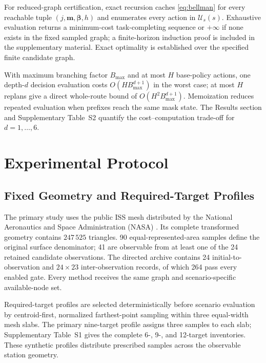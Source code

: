 \documentclass{IEEEtaes}
\begin{document}
For reduced-graph certification, exact recursion caches \eqref{eq:bellman} for every reachable tuple $(j,\mathbf m,\boldsymbol\beta,h)$ and enumerates every action in $\mathcal U_s(s)$. Exhaustive evaluation returns a minimum-cost task-completing sequence or $+\infty$ if none exists in the fixed sampled graph; a finite-horizon induction proof is included in the supplementary material. Exact optimality is established over the specified finite candidate graph.

With maximum branching factor $B_{\max}$ and at most $H$ base-policy actions, one depth-$d$ decision evaluation costs $O(HB_{\max}^{d+1})$ in the worst case; at most $H$ replans give a direct whole-route bound of $O(H^2B_{\max}^{d+1})$. Memoization reduces repeated evaluation when prefixes reach the same mask state. The Results section and Supplementary Table~S2 quantify the cost--computation trade-off for $d=1,\ldots,6$.


\section{Experimental Protocol}
\label{sec:simulation}

\subsection{Fixed Geometry and Required-Target Profiles}

The primary study uses the public ISS mesh distributed by the National Aeronautics and Space Administration (NASA) \cite{nasa_iss_gltf_model}. Its complete transformed geometry contains $247\,525$ triangles. 90 equal-represented-area samples define the original surface denominator; 41 are observable from at least one of the 24 retained candidate observations. The directed archive contains 24 initial-to-observation and $24\times23$ inter-observation records, of which 264 pass every enabled gate. Every method receives the same graph and scenario-specific available-node set.

Required-target profiles are selected deterministically before scenario evaluation by centroid-first, normalized farthest-point sampling within three equal-width mesh slabs. The primary nine-target profile assigns three samples to each slab; Supplementary Table~S1 gives the complete 6-, 9-, and 12-target inventories. These synthetic profiles distribute prescribed samples across the observable station geometry.
\end{document}

